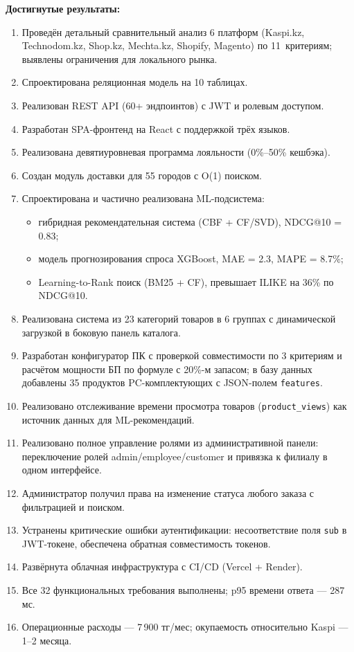 \documentclass[14pt,a4paper]{extreport}
\begin{document}
\textbf{Достигнутые результаты:}
\begin{enumerate}
  \item Проведён детальный сравнительный анализ 6 платформ (Kaspi.kz, Technodom.kz, Shop.kz, Mechta.kz, Shopify, Magento) по 11~критериям; выявлены ограничения для локального рынка.
  \item Спроектирована реляционная модель на 10 таблицах.
  \item Реализован REST API (60+ эндпоинтов) с JWT и ролевым доступом.
  \item Разработан SPA-фронтенд на React с поддержкой трёх языков.
  \item Реализована девятиуровневая программа лояльности (0\%--50\% кешбэка).
  \item Создан модуль доставки для 55 городов с O(1) поиском.
  \item Спроектирована и частично реализована ML-подсистема:
  \begin{itemize}
    \item гибридная рекомендательная система (CBF + CF/SVD), NDCG@10 = 0.83;
    \item модель прогнозирования спроса XGBoost, MAE = 2.3, MAPE = 8.7\%;
    \item Learning-to-Rank поиск (BM25 + CF), превышает ILIKE на 36\% по NDCG@10.
  \end{itemize}
  \item Реализована система из 23 категорий товаров в 6 группах с динамической загрузкой в боковую панель каталога.
  \item Разработан конфигуратор ПК с проверкой совместимости по 3 критериям и расчётом мощности БП по формуле с 20\%-м запасом; в базу данных добавлены 35 продуктов PC-комплектующих с JSON-полем \texttt{features}.
  \item Реализовано отслеживание времени просмотра товаров (\texttt{product\_views}) как источник данных для ML-рекомендаций.
  \item Реализовано полное управление ролями из административной панели: переключение ролей admin\slash{}employee\slash{}customer и привязка к филиалу в одном интерфейсе.
  \item Администратор получил права на изменение статуса любого заказа с фильтрацией и поиском.
  \item Устранены критические ошибки аутентификации: несоответствие поля \texttt{sub} в JWT-токене, обеспечена обратная совместимость токенов.
  \item Развёрнута облачная инфраструктура с CI/CD (Vercel + Render).
  \item Все 32 функциональных требования выполнены; p95 времени ответа --- 287 мс.
  \item Операционные расходы --- 7\,900 тг/мес; окупаемость относительно Kaspi --- 1--2 месяца.
\end{enumerate}
\end{document}
